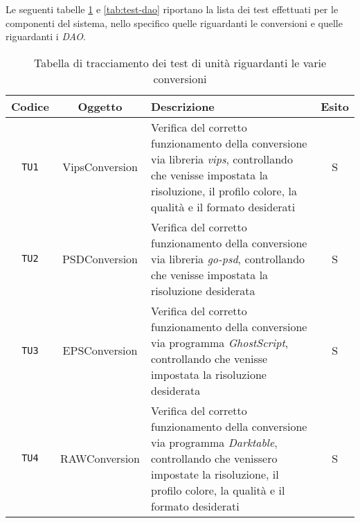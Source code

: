 Le seguenti tabelle \ref{tab:test-conversioni} e \ref{tab:test-dao} riportano la
lista dei test effettuati per le componenti del sistema, nello specifico quelle
riguardanti le conversioni e quelle riguardanti i \emph{DAO}.
\begin{table}[H]
    \caption{Tabella di tracciamento dei test di unità riguardanti le varie conversioni}
    \label{tab:test-conversioni}
    \centering
    \begin{tabularx}{\textwidth}{|c|c|X|c|}
        \hline
        \textbf{Codice} & \textbf{Oggetto} & \textbf{Descrizione}                                                                                                                                                                             & \textbf{Esito} \\
        \hline
        \verb|TU1|      & VipsConversion   & Verifica del corretto funzionamento della conversione via libreria \emph{vips}, controllando che venisse impostata la risoluzione, il profilo colore, la qualità e il formato desiderati         & S              \\
        \hline
        \verb|TU2|      & PSDConversion    & Verifica del corretto funzionamento della conversione via libreria \emph{go-psd}, controllando che venisse impostata la risoluzione desiderata                                                   & S              \\
        \hline
        \verb|TU3|      & EPSConversion    & Verifica del corretto funzionamento della conversione via programma \emph{GhostScript}, controllando che venisse impostata la risoluzione desiderata                                             & S              \\
        \hline
        \verb|TU4|      & RAWConversion    & Verifica del corretto funzionamento della conversione via programma \emph{Darktable}, controllando che venissero impostate la risoluzione, il profilo colore, la qualità e il formato desiderati & S              \\
        \hline
    \end{tabularx}
\end{table}


